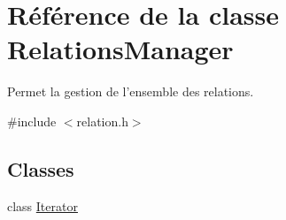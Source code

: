 \hypertarget{class_relations_manager}{\section{Référence de la classe Relations\-Manager}
\label{class_relations_manager}
}


Permet la gestion de l'ensemble des relations.  




{\ttfamily \#include $<$relation.\-h$>$}

\subsection*{Classes}
\begin{DoxyCompactItemize}
\item 
class \hyperlink{class_relations_manager_1_1_iterator}{Iterator}
\end{DoxyCompactItemize}
